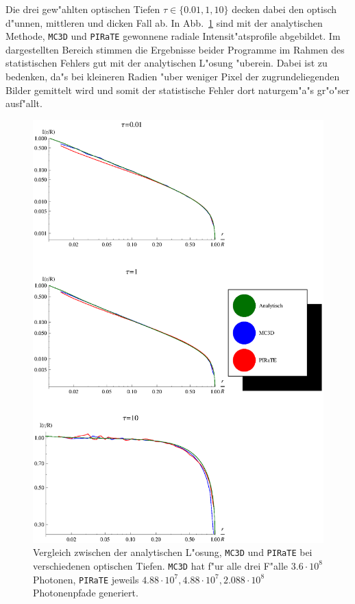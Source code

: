 	Die drei gew"ahlten optischen Tiefen $\tau\in\{0.01,1,10\}$ decken dabei den optisch d"unnen, mittleren und dicken Fall ab.	In Abb.~\ref{fig:methodcomparisongraphics} sind mit der analytischen Methode, \texttt{MC3D} und \texttt{PIRaTE} gewonnene radiale Intensit"atsprofile abgebildet.
	Im dargestellten Bereich stimmen die Ergebnisse beider Programme im Rahmen des statistischen Fehlers gut mit der analytischen L"osung "uberein. Dabei ist zu bedenken, da"s bei kleineren Radien "uber weniger Pixel der zugrundeliegenden Bilder gemittelt wird und somit der statistische Fehler dort naturgem"a"s gr"o"ser ausf"allt.
		\begin{figure}
			\centering
			\includegraphics[height=1.0\textheight]{methodcomparisongraphics.eps}
			\caption{Vergleich zwischen der analytischen L"osung, \texttt{MC3D} und \texttt{PIRaTE} bei verschiedenen optischen Tiefen. \texttt{MC3D} hat f"ur alle drei F"alle $3.6\cdot10^8$ Photonen, \texttt{PIRaTE} jeweils $4.88\cdot10^7,4.88\cdot10^7,2.088\cdot10^8$ Photonenpfade generiert.}
			\label{fig:methodcomparisongraphics}
		\end{figure}
